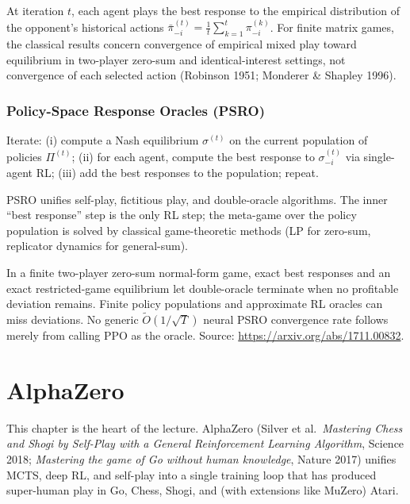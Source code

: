 \documentclass[11pt,oneside]{scrbook}
\begin{document}
At iteration $t$, each agent plays the best response to the empirical
distribution of the opponent's historical actions $\bar\pi_{-i}^{(t)} = \frac{1}{t} \sum_{k=1}^t \pi_{-i}^{(k)}$.
For finite matrix games, the classical results concern convergence of
empirical mixed play toward equilibrium in two-player zero-sum and
identical-interest settings, not convergence of each selected action (Robinson 1951; Monderer \&
Shapley 1996).

\subsection{Policy-Space Response Oracles (PSRO)}

\begin{definition}
Iterate: (i) compute a Nash equilibrium $\sigma^{(t)}$ on the current
population of policies $\Pi^{(t)}$; (ii) for each agent, compute the best
response to $\sigma^{(t)}_{-i}$ via single-agent RL; (iii) add the best
responses to the population; repeat.
\end{definition}

PSRO unifies self-play, fictitious play, and double-oracle algorithms. The
inner ``best response'' step is the only RL step; the meta-game over the
policy population is solved by classical game-theoretic methods (LP for
zero-sum, replicator dynamics for general-sum).

\begin{remark}
In a finite two-player zero-sum normal-form game, exact best responses and
an exact restricted-game equilibrium let double-oracle terminate when no
profitable deviation remains. Finite policy populations and approximate RL
oracles can miss deviations. No generic $\widetilde O(1/\sqrt T)$ neural
PSRO convergence rate follows merely from calling PPO as the oracle.
Source: \url{https://arxiv.org/abs/1711.00832}.
\end{remark}


\chapter{AlphaZero}

This chapter is the heart of the lecture. AlphaZero (Silver et al.\
\emph{Mastering Chess and Shogi by Self-Play with a General Reinforcement
Learning Algorithm}, Science 2018; \emph{Mastering the game of Go without
human knowledge}, Nature 2017) unifies MCTS, deep RL, and self-play into
a single training loop that has produced super-human play in Go, Chess,
Shogi, and (with extensions like MuZero) Atari.
\end{document}
